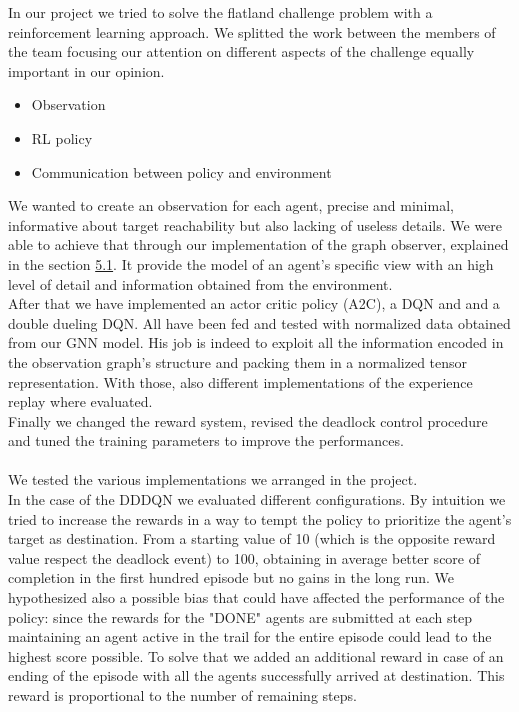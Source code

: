 In our project we tried to solve the flatland challenge problem with a reinforcement learning approach. We splitted the work between the members of the team focusing our attention on different aspects of the challenge equally important in our opinion.
\begin{itemize}
	\item Observation
	\item RL policy 
	\item Communication between policy and environment
\end{itemize}
We wanted to create an observation for each agent, precise and minimal, informative  about target reachability but also lacking of useless details. We were able to achieve that through our implementation of the graph observer, explained in the section \hyperref[sec:dagObserv]{5.1}. It provide the model of an agent's specific view with an high level of detail and information obtained from the environment. \\
After that we have implemented an actor critic policy (A2C), a DQN and and a double dueling DQN. All have been fed and tested with normalized data obtained from our GNN model. His job is indeed to exploit all the information encoded in the observation graph's structure and packing them in a normalized tensor representation. With those, also different implementations of the experience replay where evaluated.\\ 
Finally we changed the reward system, revised the deadlock control procedure and tuned the training parameters to improve the performances.\\
\\
\noindent
We tested the various implementations we arranged in the project.\\
In the case of the DDDQN we evaluated different configurations. By intuition we tried to increase the rewards in a way to tempt the policy to prioritize the agent's target as destination. From a starting value of 10 (which is the opposite reward value respect the deadlock event) to 100, obtaining in average better score of completion in the first hundred episode but no gains in the long run.
We hypothesized also a possible bias that could have affected the performance of the policy: since the rewards for the "DONE" agents are submitted at each step maintaining an agent active in the trail for the entire episode could lead to the highest score possible. To solve that we added an additional reward in case of an ending of the episode with all the agents successfully arrived at destination. This reward is proportional to the number of remaining steps.\\
